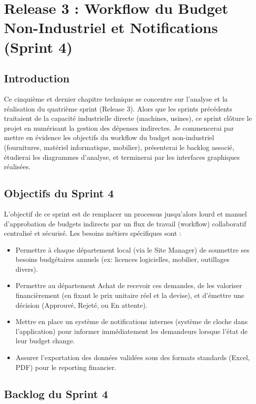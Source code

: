 \chapter{Release 3 : Workflow du Budget Non-Industriel et Notifications (Sprint 4)}

\section*{Introduction}

Ce cinquième et dernier chapitre technique se concentre sur l'analyse et la réalisation du quatrième sprint (Release 3). Alors que les sprints précédents traitaient de la capacité industrielle directe (machines, usines), ce sprint clôture le projet en numérisant la gestion des dépenses indirectes. Je commencerai par mettre en évidence les objectifs du workflow du budget non-industriel (fournitures, matériel informatique, mobilier), présenterai le backlog associé, étudierai les diagrammes d'analyse, et terminerai par les interfaces graphiques réalisées.

\section{Objectifs du Sprint 4}

L'objectif de ce sprint est de remplacer un processus jusqu'alors lourd et manuel d'approbation de budgets indirects par un flux de travail (workflow) collaboratif centralisé et sécurisé.
Les besoins métiers spécifiques sont :
\begin{itemize}[label=\textbullet]
    \item Permettre à chaque département local (via le Site Manager) de soumettre ses besoins budgétaires annuels (ex: licences logicielles, mobilier, outillages divers).
    \item Permettre au département Achat de recevoir ces demandes, de les valoriser financièrement (en fixant le prix unitaire réel et la devise), et d'émettre une décision (Approuvé, Rejeté, ou En attente).
    \item Mettre en place un système de notifications internes (système de cloche dans l'application) pour informer immédiatement les demandeurs lorsque l'état de leur budget change.
    \item Assurer l'exportation des données validées sous des formats standards (Excel, PDF) pour le reporting financier.
\end{itemize}

\section{Backlog du Sprint 4}

